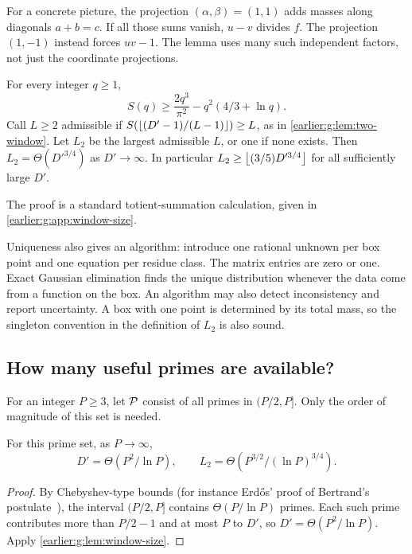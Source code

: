 For a concrete picture, the projection \((\alpha,\beta)=(1,1)\)
adds masses along diagonals \(a+b=c\). If all those sums vanish,
\(u-v\) divides \(f\). The projection \((1,-1)\) instead forces
\(uv-1\). The lemma uses many such independent factors, not just
the coordinate projections.

\begin{lemma}\label{earlier:g:lem:window-size}
For every integer \(q\ge1\),
\[
 S(q)\ge\frac{2q^3}{\pi^2}-q^2(4/3+\ln q).
\]
Call \(L\ge2\) admissible if \(S(\left\lfloor(D'-1)/(L-1)\right\rfloor)\ge L\), as in
\cref{earlier:g:lem:two-window}. Let \(L_2\) be the largest admissible \(L\),
or one if none exists. Then
\(L_2=\Theta(D'^{3/4})\) as \(D'\to\infty\).
In particular \(L_2\ge\left\lfloor(3/5)D'^{3/4}\right\rfloor\) for all sufficiently
large \(D'\).
\end{lemma}
The proof is a standard totient-summation calculation, given in
\cref{earlier:g:app:window-size}.

Uniqueness also gives an algorithm: introduce one rational unknown
per box point and one equation per residue class. The matrix entries
are zero or one. Exact Gaussian elimination finds the unique
distribution whenever the data come from a function on the box.
An algorithm may also detect inconsistency and report uncertainty.
A box with one point is determined by its total mass, so the
singleton convention in the definition of \(L_2\) is also sound.

\subsection{How many useful primes are available?}

For an integer \(P\ge3\), let \(\mathcal P\) consist of all primes in
\((P/2,P]\). Only the order of magnitude of this set is needed.

\begin{lemma}\label{earlier:g:lem:primes}
For this prime set, as \(P\to\infty\),
\[
 D'=\Theta(P^2/\ln P),\qquad
 L_2=\Theta\!\left(P^{3/2}/(\ln P)^{3/4}\right).
\]
\end{lemma}
\begin{proof}
By Chebyshev-type bounds (for instance Erd\H{o}s' proof of
Bertrand's postulate~\cite{Erdos32}), the interval \((P/2,P]\)
contains \(\Theta(P/\ln P)\) primes.
Each such prime contributes
more than \(P/2-1\) and at most \(P\) to \(D'\), so
\(D'=\Theta(P^2/\ln P)\). Apply \cref{earlier:g:lem:window-size}.
\end{proof}

